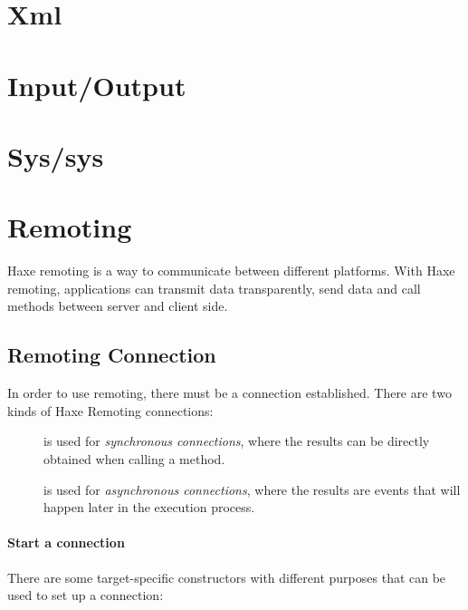 \section{Xml}
\label{std-Xml}

\section{Input/Output}
\label{std-input-output}

\section{Sys/sys}
\label{std-sys}

\section{Remoting}
\label{std-remoting}

Haxe remoting is a way to communicate between different platforms. With Haxe remoting, applications can transmit data transparently, send data and call methods between server and client side.

\subsection{Remoting Connection}
\label{std-remoting-connection}

In order to use remoting, there must be a connection established. There are two kinds of Haxe Remoting connections: 
\begin{description}
	\item[] is used for \emph{synchronous connections}, where the results can be directly obtained when calling a method. 
	\item[] is used for \emph{asynchronous connections}, where the results are events that will happen later in the execution process.
\end{description}

\paragraph{Start a connection}
There are some target-specific constructors with different purposes that can be used to set up a connection:


